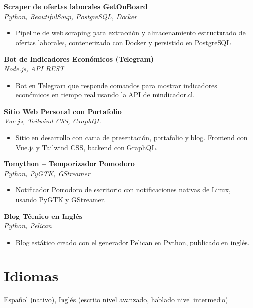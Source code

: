 \documentclass[11pt,a4paper]{article}
\newcommand{\proj}[2]{%
    \textbf{#1} \\
    \textit{#2}\\[2pt]
}
\begin{document}
\proj{Scraper de ofertas laborales GetOnBoard}{Python, BeautifulSoup, PostgreSQL, Docker}
\begin{itemize}[leftmargin=*, itemsep=1pt, topsep=2pt]
    \item Pipeline de web scraping para extracción y almacenamiento estructurado de ofertas laborales, contenerizado con Docker y persistido en PostgreSQL
\end{itemize}

\proj{Bot de Indicadores Económicos (Telegram)}{Node.js, API REST}
\begin{itemize}[leftmargin=*, itemsep=1pt, topsep=2pt]
    \item Bot en Telegram que responde comandos para mostrar indicadores económicos en tiempo real usando la API de mindicador.cl.
\end{itemize}

\proj{Sitio Web Personal con Portafolio}{Vue.js, Tailwind CSS, GraphQL}
\begin{itemize}[leftmargin=*, itemsep=1pt, topsep=2pt]
    \item Sitio en desarrollo con carta de presentación, portafolio y blog. Frontend con Vue.js y Tailwind CSS, backend con GraphQL.
\end{itemize}

\proj{Tomython -- Temporizador Pomodoro}{Python, PyGTK, GStreamer}
\begin{itemize}[leftmargin=*, itemsep=1pt, topsep=2pt]
    \item Notificador Pomodoro de escritorio con notificaciones nativas de Linux, usando PyGTK y GStreamer.
\end{itemize}

\proj{Blog Técnico en Inglés}{Python, Pelican}
\begin{itemize}[leftmargin=*, itemsep=1pt, topsep=2pt]
    \item Blog estático creado con el generador Pelican en Python, publicado en inglés.
\end{itemize}

\section*{Idiomas}
Español (nativo), Inglés (escrito nivel avanzado, hablado nivel intermedio)
\end{document}
